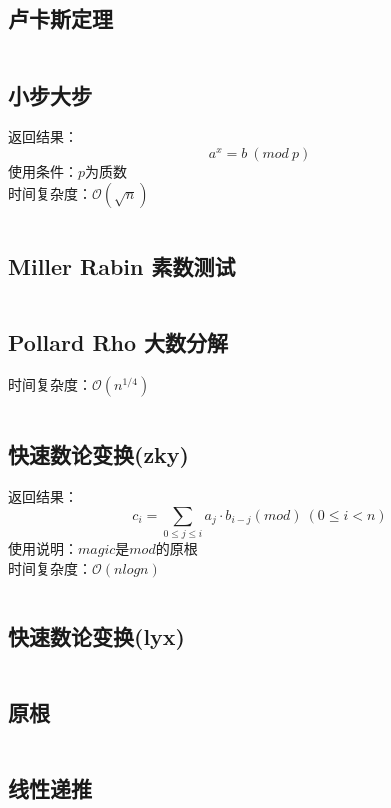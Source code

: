 \documentclass[a4paper]{article}
\newcommand{\cppcode}[1]{
    \inputminted[mathescape,
    frame=lines,linenos]{cpp}{source/#1}
}
\begin{document}
\subsection{卢卡斯定理}
\cppcode{number-theory/Lucas.cpp}

\subsection{小步大步}

返回结果：$$a^x=b \ (mod \ p)$$
\indent 使用条件：$p$为质数\\
\indent 时间复杂度：$\mathcal{O}(\sqrt{n})$

\cppcode{number-theory/BSGS.cpp}

\subsection{Miller Rabin 素数测试}

\cppcode{number-theory/miller-rabin.cpp}

\subsection{Pollard Rho 大数分解}

时间复杂度：$\mathcal{O}(n^{1/4})$

\cppcode{number-theory/pollard-rho.cpp}



\subsection{快速数论变换(zky)}
返回结果：$$c_i=\sum_{0 \leq j \leq i} a_j \cdot b_{i-j} (mod) \ (0 \leq i < n)$$
\indent 使用说明：$magic$是$mod$的原根\\
\indent 时间复杂度：$\mathcal{O}(n log n)$
\cppcode{number-theory/number-theoretic-transform.cpp}

\subsection{快速数论变换(lyx)}
\cppcode{number-theory/DFT.cpp}

\subsection{原根}
\cppcode{number-theory/primeroot.cpp}

\subsection{线性递推}
\cppcode{number-theory/linear-recurrence.cpp}
\end{document}
